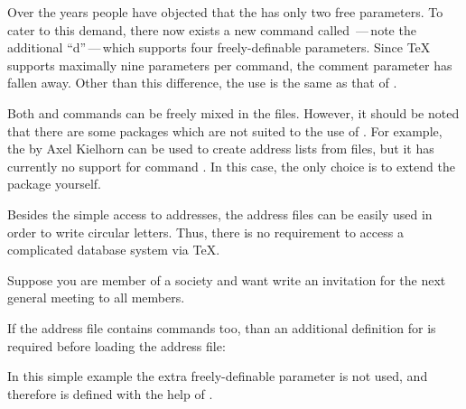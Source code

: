 \begin{Declaration}
\end{Declaration}%
Over the years people have objected that the  has only two
free parameters. To cater to this demand, there now exists a new command
called \,---\,note the additional ``d''\,---\,which supports
four freely-definable parameters. Since {\TeX} supports maximally nine
parameters per command, the comment parameter has fallen away. Other than this
difference, the use is the same as that of .

Both  and  commands can be freely mixed in
the  files. However, it should be noted that there are some packages
which are not suited to the use of .  For example, the
 by Axel Kielhorn can be used to create address lists from
 files, but it has currently no support for command
.  In this case, the only choice is to extend the package
yourself.%
%
\EndIndexGroup

Besides the simple access to addresses, the address files can be
easily used in order to write circular letters.  Thus, there is no
requirement to access a complicated database system via {\TeX}.
%
\begin{Example}
  Suppose you are member of a society and want write an invitation for
  the next general meeting to all members.
  If the address file contains  commands too, than an
  additional definition for  is required before loading
  the address file:
\begin{lstcode}
  \renewcommand*{\addrentry}[9]{%
    \adrentry{#1}{#2}{#3}{#4}{#5}{#6}{#7}{#9}%
  }
\end{lstcode}
  In this simple example the extra freely-definable parameter is not
  used, and therefore  is defined with the help of
  .
\end{Example}

